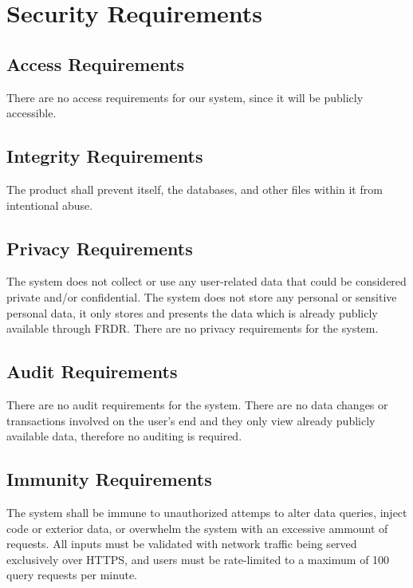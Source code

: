 \documentclass[12pt]{article}
\begin{document}
\section{Security Requirements}
\subsection{Access Requirements}

\par{There are no access requirements for our system, since it will be publicly accessible.}

\subsection{Integrity Requirements}

\par{The product shall prevent itself, the databases, and other files within it from intentional abuse.}

\subsection{Privacy Requirements}

\par{The system does not collect or use any user-related data that could be considered private and/or confidential. \newline \indent
The system does not store any personal or sensitive personal data, it only stores and presents the data which is already 
publicly available through FRDR. \newline \indent There are no privacy requirements for the system.}

\subsection{Audit Requirements}

\par{There are no audit requirements for the system. There are no data changes or transactions involved on the user's end 
and they only view already publicly available data, therefore no auditing is required.}

\subsection{Immunity Requirements}

\par{The system shall be immune to unauthorized attemps to alter data queries, inject code or exterior data, or overwhelm 
the system with an excessive ammount of requests. All inputs must be validated with network traffic being served exclusively over HTTPS, 
and users must be rate-limited to a maximum of 100 query requests per minute.}
\end{document}
